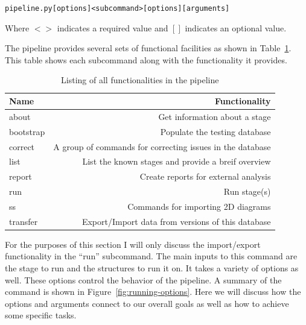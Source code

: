 \begin{alltt}
pipeline.py [options] <subcommand> [options] [arguments]
\end{alltt}

Where $<>$ indicates a required value and $[]$ indicates an optional
value.

The pipeline provides several sets of functional facilities as shown in
Table~\ref{tab:pipeline-functionality}. This table shows each subcommand along
with the functionality it provides.

\begin{table}[ht]
\begin{tabular}{lr}
\toprule
Name & Functionality \\
\midrule
about & Get information about a stage \\
bootstrap & Populate the testing database \\
correct & A group of commands for correcting issues in the database \\
list & List the known stages and provide a breif overview \\
report & Create reports for external analysis \\
run & Run stage(s) \\
ss & Commands for importing 2D diagrams \\
transfer & Export/Import data from versions of this database \\
\bottomrule
\end{tabular}
\caption{Listing of all functionalities in the pipeline}
\label{tab:pipeline-functionality}
\end{table}

For the purposes of this section I will only discuss the import/export
functionality in the ``run'' subcommand. The main inputs to this command are the
stage to run and the structures to run it on. It takes a variety of options as
well. These options control the behavior of the pipeline. A summary of the
command is shown in Figure~\ref{fig:running-options}. Here we will discuss how
the options and arguments connect to our overall goals as well as how to achieve
some specific tasks.


